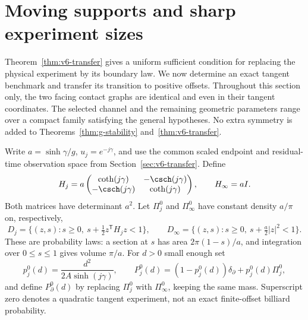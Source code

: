 \section{Moving supports and sharp experiment sizes}
\label{sec:v7-sharp}
Theorem~\ref{thm:v6-transfer} gives a uniform sufficient condition for replacing the physical experiment by its boundary law. We now determine an exact tangent benchmark and transfer its transition to positive offsets. Throughout this section only, the two facing contact graphs are identical and even in their tangent coordinates. The selected channel and the remaining geometric parameters range over a compact family satisfying the general hypotheses. No extra symmetry is added to Theorems~\ref{thm:g-stability} and~\ref{thm:v6-transfer}.

Write $a=\sinh\gamma/g$, $u_j=e^{-j\gamma}$, and use the common scaled endpoint and residual-time observation space from Section~\ref{sec:v6-transfer}. Define
\begin{equation}\label{eq:v7-quadratic-hessians}
 H_j=a\begin{pmatrix}\coth(j\gamma)&-\csch(j\gamma)\\-\csch(j\gamma)&\coth(j\gamma)\end{pmatrix},
 \qquad H_\infty=aI.
\end{equation}
Both matrices have determinant $a^2$. Let $\Pi_j^0$ and $\Pi_\infty^0$ have constant density $a/\pi$ on, respectively,
\[
 D_j=\{(z,s):s\ge0,\ s+\tfrac12z^{\mathsf T}H_jz<1\},
 \qquad D_\infty=\{(z,s):s\ge0,\ s+\tfrac a2|z|^2<1\}.
\]
These are probability laws: a section at $s$ has area $2\pi(1-s)/a$, and integration over $0\le s\le1$ gives volume $\pi/a$. For $d>0$ small enough set
\begin{equation}\label{eq:v7-p0}
 p_j^0(d)=\frac{d^2}{2A\sinh(j\gamma)},\qquad
 P_j^0(d)=(1-p_j^0(d))\delta_\partial+p_j^0(d)\Pi_j^0,
\end{equation}
and define $P_\partial^0(d)$ by replacing $\Pi_j^0$ with $\Pi_\infty^0$, keeping the same mass. Superscript zero denotes a quadratic tangent experiment, not an exact finite-offset billiard probability.

